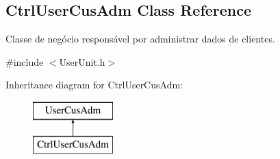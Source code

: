 \hypertarget{classCtrlUserCusAdm}{\subsection{Ctrl\-User\-Cus\-Adm Class Reference}
\label{d8/d93/classCtrlUserCusAdm}
}


Classe de negócio responsável por administrar dados de clientes.  




{\ttfamily \#include $<$User\-Unit.\-h$>$}

Inheritance diagram for Ctrl\-User\-Cus\-Adm\-:\begin{figure}[H]
\begin{center}
\leavevmode
\includegraphics[height=2.000000cm]{d8/d93/classCtrlUserCusAdm}
\end{center}
\end{figure}

